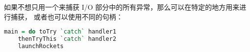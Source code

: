\documentclass[./main.tex]{subfiles}
\begin{document}
如果不想只用一个来捕获 I/O 部分中的所有异常，那么可以在特定的地方用来进行捕获，
或者也可以使用不同的句柄：

\begin{lstlisting}[language=Haskell]
  main = do toTry `catch` handler1
    thenTryThis `catch` handler2
    launchRockets
\end{lstlisting}
\end{document}

